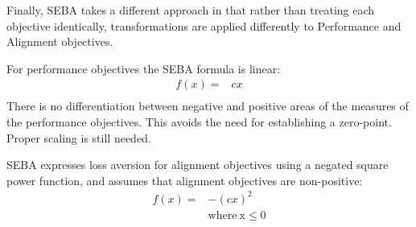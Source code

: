 Finally, SEBA takes a different approach in that rather than treating each objective identically, transformations are applied differently to Performance and Alignment objectives.%

For performance objectives the SEBA formula is linear:
\begin{align}
f(x)= &  cx \\ \nonumber
\end{align}
There is no differentiation between negative and positive areas of the measures of the performance objectives. This avoids the need for establishing a zero-point. Proper scaling is still needed.

SEBA expresses loss aversion for alignment objectives using a negated square power function, and assumes that alignment objectives are non-positive:
\begin{align}
\label{eq:seba}
f(x)= &  -(cx)^2 \\ \nonumber
  &  \mathrm{ where \: x \leq 0}
\end{align}

